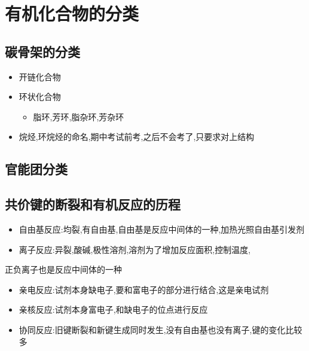 \documentclass[11pt]{article}
\begin{document}
\section{有机化合物的分类}
\label{sec:orga51e610}
\subsection{碳骨架的分类}
\label{sec:org714b047}
\begin{itemize}
\item 开链化合物
\item 环状化合物
\begin{itemize}
\item 脂环,芳环,脂杂环,芳杂环
\end{itemize}
\item 烷烃,环烷烃的命名,期中考试前考,之后不会考了,只要求对上结构
\end{itemize}
\subsection{官能团分类}
\label{sec:orge9e8f3f}
\subsection{共价键的断裂和有机反应的历程}
\label{sec:org4fb12ab}
\begin{itemize}
\item 自由基反应:均裂,有自由基,自由基是反应中间体的一种,加热光照自由基引发剂
\item 离子反应:异裂,酸碱,极性溶剂,溶剂为了增加反应面积,控制温度,
\end{itemize}
正负离子也是反应中间体的一种
\begin{itemize}
\item 亲电反应:试剂本身缺电子,要和富电子的部分进行结合,这是亲电试剂
\item 亲核反应:试剂本身富电子,和缺电子的位点进行反应
\end{itemize}
\begin{itemize}
\item 协同反应:旧键断裂和新键生成同时发生,没有自由基也没有离子,键的变化比较多
\end{itemize}
\end{document}
